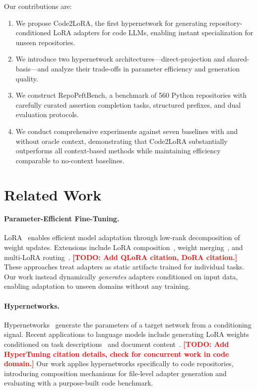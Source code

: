 \documentclass[11pt]{article}
\newcommand{\method}{Code2LoRA}
\newcommand{\benchmark}{RepoPeftBench}
\newcommand{\todo}[1]{\textcolor{red}{\textbf{[TODO: #1]}}}
\begin{document}
Our contributions are:
\begin{enumerate}[nosep]
    \item We propose \method{}, the first hypernetwork for generating repository-conditioned LoRA adapters for code LLMs, enabling instant specialization for unseen repositories.
    \item We introduce two hypernetwork architectures---direct-projection and shared-basis---and analyze their trade-offs in parameter efficiency and generation quality.
    \item We construct \benchmark{}, a benchmark of 560 Python repositories with carefully curated assertion completion tasks, structured prefixes, and dual evaluation protocols.
    \item We conduct comprehensive experiments against seven baselines with and without oracle context, demonstrating that \method{} substantially outperforms all context-based methods while maintaining efficiency comparable to no-context baselines.
\end{enumerate}

\section{Related Work}
\label{sec:related}

\paragraph{Parameter-Efficient Fine-Tuning.}
LoRA~\cite{hu2022lora} enables efficient model adaptation through low-rank decomposition of weight updates.
Extensions include LoRA composition~\cite{zhang2023composing}, weight merging~\cite{yadav2024ties}, and multi-LoRA routing~\cite{huang2024lorahub}.
\todo{Add QLoRA citation, DoRA citation.}
These approaches treat adapters as static artifacts trained for individual tasks.
Our work instead dynamically \emph{generates} adapters conditioned on input data, enabling adaptation to unseen domains without any training.

\paragraph{Hypernetworks.}
Hypernetworks~\cite{ha2017hypernetworks} generate the parameters of a target network from a conditioning signal.
Recent applications to language models include generating LoRA weights conditioned on task descriptions~\cite{phang2023hypertuning} and document content~\cite{von2024language}.
\todo{Add HyperTuning citation details, check for concurrent work in code domain.}
Our work applies hypernetworks specifically to code repositories, introducing composition mechanisms for file-level adapter generation and evaluating with a purpose-built code benchmark.
\end{document}
